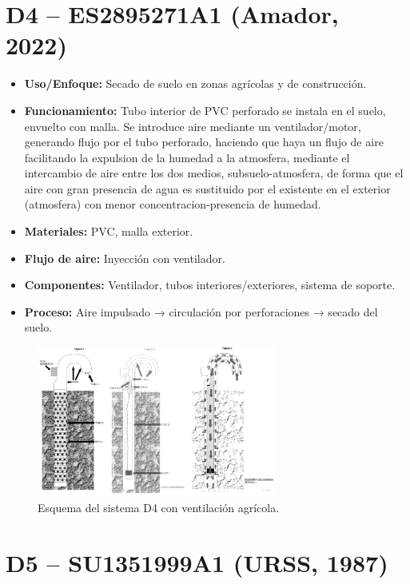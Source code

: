 \documentclass[12pt]{article}
\begin{document}
\section*{ D4 – ES2895271A1 (Amador, 2022)}

\begin{itemize}
    \item \textbf{Uso/Enfoque:} Secado de suelo en zonas agrícolas y de construcción.
    \item \textbf{Funcionamiento:} Tubo interior de PVC perforado se instala en el suelo, envuelto con malla. Se introduce aire mediante un ventilador/motor, generando flujo por el tubo perforado, haciendo que haya un flujo de aire facilitando la expulsion de la humedad a la atmosfera, mediante el intercambio de aire entre los dos medios, subsuelo-atmosfera, de forma que el aire con gran presencia de agua es sustituido por el existente en el exterior (atmosfera) con menor concentracion-presencia de humedad.
    \item \textbf{Materiales:} PVC, malla exterior.
    \item \textbf{Flujo de aire:} Inyección con ventilador.
    \item \textbf{Componentes:} Ventilador, tubos interiores/exteriores, sistema de soporte.
    \item \textbf{Proceso:} Aire impulsado → circulación por perforaciones → secado del suelo.
\end{itemize}

\begin{figure}[H]
\centering
\includegraphics[width=0.7\textwidth]{images/d4_amador.png}
\caption{Esquema del sistema D4 con ventilación agrícola.}
\end{figure}

\section*{ D5 – SU1351999A1 (URSS, 1987)}
\end{document}
